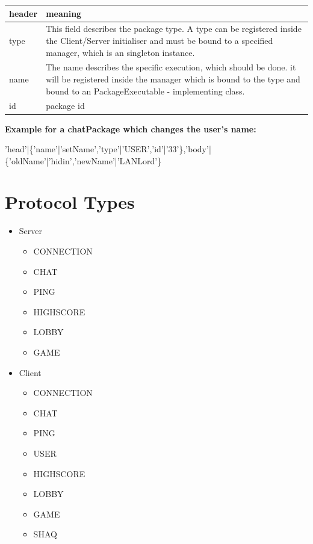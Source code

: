 \documentclass{scrartcl}
\begin{document}
\begin{center}
    \begin{tabular}{| p{2cm} | p{10cm} |}
    \hline
    header & meaning \\ \hline

    type &  This field describes the package type. A type can be registered inside the Client/Server initialiser and must be bound to a specified manager, which is an singleton instance.\\ \hline

    name & The name describes the specific execution,
    which should be done. it will be registered inside the manager which is bound to the type and bound to an PackageExecutable - implementing class. \\ \hline

    id &  package id\\ \hline

    \end{tabular}

\end{center}
\textbf{Example for a chatPackage which changes the user's name:}
\begin{center}
    'head'|\{'name'|'setName','type'|'USER','id'|'33'\},'body'|\{'oldName'|'hidin','newName'|'LANLord'\}
\end{center}


\pagebreak
\section{Protocol Types}
\begin{itemize}
    \item Server
    \begin{itemize}
		\item CONNECTION
		\item CHAT
		\item PING
		\item HIGHSCORE
		\item LOBBY
		\item GAME
    \end{itemize}
    \item Client
    \begin{itemize}
		\item CONNECTION
		\item CHAT
		\item PING
		\item USER
		\item HIGHSCORE
		\item LOBBY
		\item GAME
		\item SHAQ
    \end{itemize}
\end{itemize}
\end{document}

